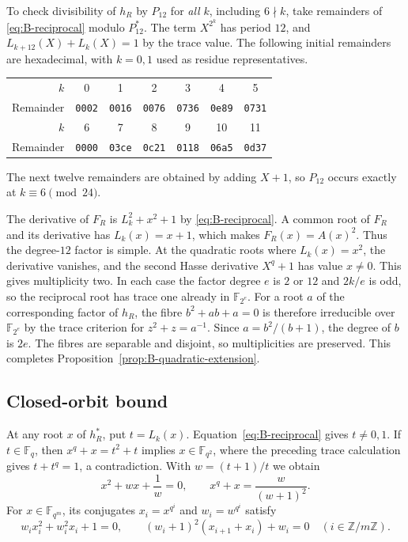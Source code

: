 \documentclass[11pt]{article}
\theoremstyle{definition}
\theoremstyle{remark}
\begin{document}
To check divisibility of $h_R$ by $P_{12}$ for \emph{all} $k$, including
$6\nmid k$, take remainders of \eqref{eq:B-reciprocal} modulo
$P_{12}^*$. The term $X^{2^k}$ has period $12$, and
$L_{k+12}(X)+L_k(X)=1$ by the trace value. The following initial
remainders are hexadecimal, with $k=0,1$ used as residue representatives.
\begin{center}\small
\begin{tabular}{@{}r*{6}{c}@{}}
\toprule
$k$ & 0 & 1 & 2 & 3 & 4 & 5\\
Remainder & \texttt{0002} & \texttt{0016} & \texttt{0076} &
\texttt{0736} & \texttt{0e89} & \texttt{0731}\\
\midrule
$k$ & 6 & 7 & 8 & 9 & 10 & 11\\
Remainder & \texttt{0000} & \texttt{03ce} & \texttt{0c21} &
\texttt{0118} & \texttt{06a5} & \texttt{0d37}\\
\bottomrule
\end{tabular}
\end{center}
The next twelve remainders are obtained by adding $X+1$,
so $P_{12}$ occurs exactly at $k\equiv6\pmod{24}$.

The derivative of $F_R$ is $L_k^2+x^2+1$ by
\eqref{eq:B-reciprocal}. A common root of $F_R$ and its derivative
has $L_k(x)=x+1$, which makes $F_R(x)=A(x)^2$. Thus the degree-$12$
factor is simple. At the quadratic roots where $L_k(x)=x^2$,
the derivative vanishes, and the second Hasse derivative
$X^q+1$ has value $x\ne0$. This gives multiplicity two.
In each case the factor degree $e$ is $2$ or $12$ and $2k/e$
is odd, so the reciprocal root has trace one already in
$\mathbb F_{2^e}$. For a root $a$ of the corresponding factor of
$h_R$, the fibre $b^2+ab+a=0$ is therefore irreducible over
$\mathbb F_{2^e}$ by the trace criterion for $z^2+z=a^{-1}$.
Since $a=b^2/(b+1)$, the degree of $b$ is $2e$.
The fibres are separable and disjoint, so multiplicities are
preserved. This completes Proposition~\ref{prop:B-quadratic-extension}.

\subsection{Closed-orbit bound}
At any root $x$ of $h_R^*$, put $t=L_k(x)$.
Equation~\eqref{eq:B-reciprocal} gives $t\ne0,1$.
If $t\in\mathbb F_q$, then $x^q+x=t^2+t$ implies
$x\in\mathbb F_{q^2}$, where the preceding trace calculation
gives $t+t^q=1$, a contradiction. With $w=(t+1)/t$ we obtain
\begin{equation}\label{eq:B-orbit-relation}
 x^2+wx+\frac1w=0,\qquad x^q+x=\frac{w}{(w+1)^2}.
\end{equation}
For $x\in\mathbb F_{q^m}$, its conjugates
$x_i=x^{q^i}$ and $w_i=w^{q^i}$ satisfy
\begin{equation}\label{eq:B-orbit-system}
 w_i x_i^2+w_i^2x_i+1=0,\qquad
 (w_i+1)^2(x_{i+1}+x_i)+w_i=0
 \quad(i\in\mathbb Z/m\mathbb Z).
\end{equation}
\end{document}
